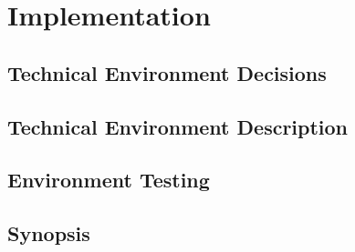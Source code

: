 
\chapter{Implementation} %

\label{chap:Chapter7} %


\section{Technical Environment Decisions}

\section{Technical Environment Description}

\section{Environment Testing}

\section{Synopsis}